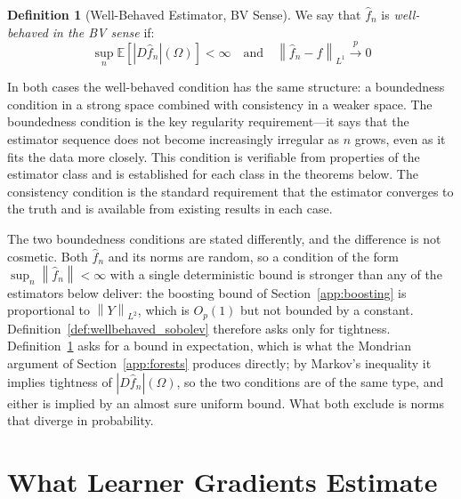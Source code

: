 \documentclass[12pt,a4paper]{article}
\numberwithin{equation}{section}
\theoremstyle{plain}
\theoremstyle{definition}
\newtheorem{definition}{Definition}
\newcommand{\norm}[1]{\left\| #1 \right\|}
\newcommand{\E}{\mathbb{E}}
\newcommand{\fn}{\hat{f}_n}
\newcommand{\xrightarrowp}{\xrightarrow{p}}
\begin{document}
	\begin{definition}[Well-Behaved Estimator, BV Sense]
		\label{def:wellbehaved_bv}
		We say that $\fn$ is \emph{well-behaved in the BV sense} if:
		\begin{equation}
			\sup_n \E\left[|D\fn|(\Omega)\right] < \infty \quad \text{and} \quad
			\norm{\fn - f}_{L^1} \xrightarrowp 0
		\end{equation}
	\end{definition}
	
	In both cases the well-behaved condition has the same structure: a
	boundedness condition in a strong space combined with consistency in a
	weaker space. The boundedness condition is the key regularity
	requirement---it says that the estimator sequence does not become
	increasingly irregular as $n$ grows, even as it fits the data more closely.
	This condition is verifiable from properties of the estimator class and is
	established for each class in the theorems below. The consistency condition
	is the standard requirement that the estimator converges to the truth and is
	available from existing results in each case.

	The two boundedness conditions are stated differently, and the difference is
	not cosmetic. Both $\fn$ and its norms are random, so a condition of the form
	$\sup_n \norm{\fn} < \infty$ with a single deterministic bound is stronger
	than any of the estimators below deliver: the boosting bound of
	Section~\ref{app:boosting} is proportional to $\norm{Y}_{L^2}$, which is
	$O_p(1)$ but not bounded by a constant. Definition~\ref{def:wellbehaved_sobolev}
	therefore asks only for tightness. Definition~\ref{def:wellbehaved_bv} asks
	for a bound in expectation, which is what the Mondrian argument of
	Section~\ref{app:forests} produces directly; by Markov's inequality it
	implies tightness of $|D\fn|(\Omega)$, so the two conditions are of the same
	type, and either is implied by an almost sure uniform bound. What both
	exclude is norms that diverge in probability.

	\section{What Learner Gradients Estimate}
	\label{sec:interpretation}
	
\end{document}
